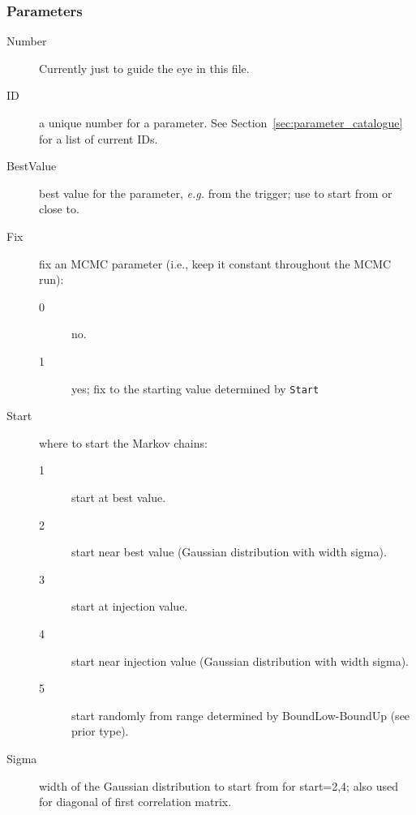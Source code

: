 \subsubsection{Parameters}
\begin{description}                
\item[Number] Currently just to guide the eye in this file.
\item[ID] a unique number for a parameter.  See Section~\ref{sec:parameter_catalogue} for a list of current IDs.
\item[BestValue] best value for the parameter, \textit{e.g.} from the trigger;  use to start from or close to.
\item[Fix] fix an MCMC parameter (i.e., keep it constant throughout the MCMC run):
  \begin{description}                
  \item[0] no.
  \item[1] yes; fix to the starting value determined by \texttt{Start}
  \end{description}                
\item[Start] where to start the Markov chains:
  \begin{description}                
  \item[1] start at best value.
  \item[2] start near best value (Gaussian distribution with width sigma).
  \item[3] start at injection value.
  \item[4] start near injection value (Gaussian distribution with width sigma).
  \item[5] start randomly from range determined by BoundLow-BoundUp (see prior type).
  \end{description}                
\item[Sigma] width of the Gaussian distribution to start from for start=2,4; also used for diagonal of first correlation matrix.
\end{description}                

